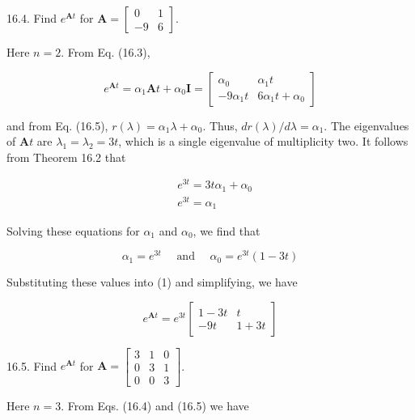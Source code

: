 \documentclass[10pt]{article}
\begin{document}
16.4. Find $e^{\mathbf{A} t}$ for $\mathbf{A}=\left[\begin{array}{rr}0 & 1 \\ -9 & 6\end{array}\right]$.

Here $n=2$. From Eq. (16.3),

\[
e^{\mathbf{A} t}=\alpha_{1} \mathbf{A} t+\alpha_{0} \mathbf{I}=\left[\begin{array}{cc}
\alpha_{0} & \alpha_{1} t  \tag{1}\\
-9 \alpha_{1} t & 6 \alpha_{1} t+\alpha_{0}
\end{array}\right]
\]

and from Eq. (16.5), $r(\lambda)=\alpha_{1} \lambda+\alpha_{0}$. Thus, $d r(\lambda) / d \lambda=\alpha_{1}$. The eigenvalues of $\mathbf{A} t$ are $\lambda_{1}=\lambda_{2}=3 t$, which is a single eigenvalue of multiplicity two. It follows from Theorem 16.2 that

$$
\begin{aligned}
& e^{3 t}=3 t \alpha_{1}+\alpha_{0} \\
& e^{3 t}=\alpha_{1}
\end{aligned}
$$

Solving these equations for $\alpha_{1}$ and $\alpha_{0}$, we find that

$$
\alpha_{1}=e^{3 t} \quad \text { and } \quad \alpha_{0}=e^{3 t}(1-3 t)
$$

Substituting these values into (1) and simplifying, we have

$$
e^{\mathbf{A} t}=e^{3 t}\left[\begin{array}{cc}
1-3 t & t \\
-9 t & 1+3 t
\end{array}\right]
$$

16.5. Find $e^{\mathbf{A} t}$ for $\mathbf{A}=\left[\begin{array}{lll}3 & 1 & 0 \\ 0 & 3 & 1 \\ 0 & 0 & 3\end{array}\right]$.

Here $n=3$. From Eqs. (16.4) and (16.5) we have
\end{document}
